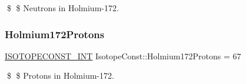 \$ \$ Neutrons in Holmium-\/172. \mbox{\label{group___isotope_const-_holmium-_ho172_ga587145c66196d04c8e184ef3481d746a}} 
\subsubsection{\texorpdfstring{Holmium172\+Protons}{Holmium172Protons}}
{\footnotesize\ttfamily \mbox{\hyperlink{group___isotope_const-_macros_ga5f18360b3e99483a35c32d789e62621c}{I\+S\+O\+T\+O\+P\+E\+C\+O\+N\+S\+T\+\_\+\+I\+NT}} Isotope\+Const\+::\+Holmium172\+Protons = 67}

\$ \$ Protons in Holmium-\/172. 